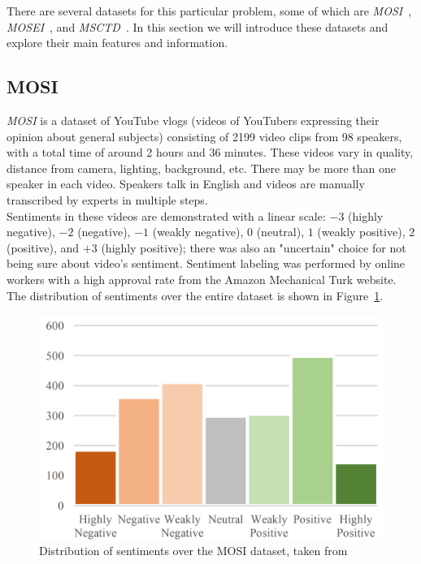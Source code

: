 There are several datasets for this particular problem, some of which are \textit{MOSI}~\cite{zadeh2016mosi},  \textit{MOSEI}~\cite{zadeh2018multimodal}, and \textit{MSCTD}~\cite{liang2022msctd}. In this section we will introduce these datasets and explore their main features and information.


\subsection{MOSI}
\textit{MOSI} is a dataset of YouTube vlogs (videos of YouTubers expressing their opinion about general subjects) consisting of 2199 video clips from 98 speakers, with a total time of around 2 hours and 36 minutes. These videos vary in quality, distance from camera, lighting, background, etc. There may be more than one speaker in each video. Speakers talk in English and videos are manually transcribed by experts in multiple steps. 
\\
Sentiments in these videos are demonstrated with a linear scale: $-3$ (highly negative), $-2$ (negative), $-1$ (weakly negative), $0$ (neutral), $1$ (weakly positive), $2$ (positive), and $+3$ (highly positive); there was also an "uncertain" choice for not being sure about video's sentiment. Sentiment labeling was performed by online workers with a high approval rate from the Amazon Mechanical Turk website. The distribution of sentiments over the entire dataset is shown in Figure~\ref{fig:MOSIhist}.

\begin{figure}[t]
   \centering
   \includegraphics[width=\linewidth]{fig/MOSIhist}
    \caption{Distribution of sentiments over the MOSI dataset, taken from~\cite{zadeh2016mosi}}
    \label{fig:MOSIhist}
\end{figure}

